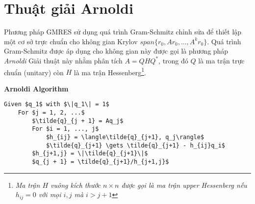 \section{Thuật giải Arnoldi}
Phương pháp GMRES sử dụng quá trình Gram-Schmitz chỉnh sửa để thiết lập
một cơ sở trực chuẩn cho không gian Krylov $span\{r_0, Ar_0, ..., A^kr_0 \}$.
Quá trình Gram-Schmitz được áp dụng cho không gian này được gọi là phương pháp \textit{Arnoldi}
Giải thuật này nhằm phân tích $A=QHQ^*$, trong đó $Q$ là ma trận trực chuẩn (unitary) 
còn $H$ là ma trận Hessenberg\footnote{
    \textit{
    Ma trận $H$ vuông kích thước $n \times n$ được gọi là ma trận upper Hessenberg nếu
    $h_{ij} = 0$ với mọi $i,j$ mà $i > j + 1$
}
}.



\textbf{Arnoldi Algorithm}
\begin{lstlisting}[style=algo]
    Given $q_1$ with $\|q_1\| = 1$
    For $j = 1, 2, ...$
        $\tilde{q}_{j + 1} = Aq_j$
        For $i = 1, ..., j$
            $h_{ij} = \langle\tilde{q}_{j+1}, q_j\rangle$
            $\tilde{q}_{j+1} \gets \tilde{q}_{j+1} - h_{ij}q_i$
        $h_{j+1,j} = \|\tilde{q}_{j+1}\|$
        $q_{j + 1} = \tilde{q}_{j+1}/h_{j+1,j}$
\end{lstlisting}

